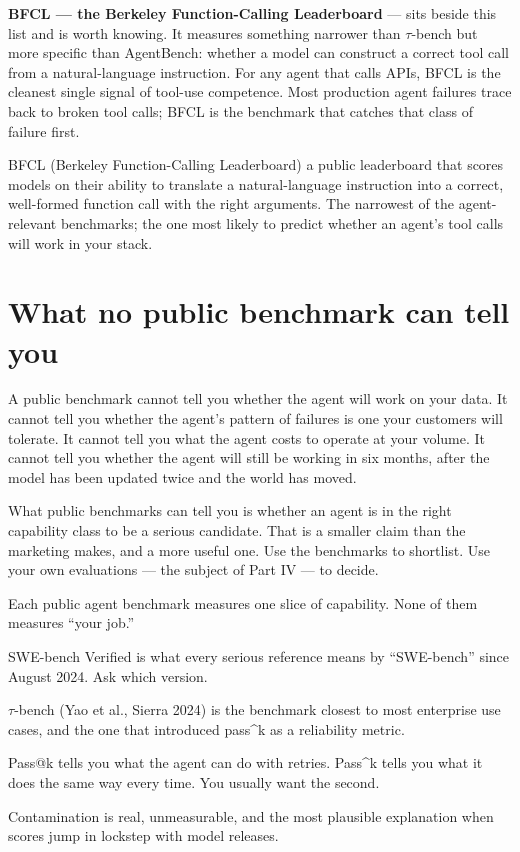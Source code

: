 \textbf{BFCL --- the Berkeley Function-Calling Leaderboard} \citep{bfcl-2024} --- sits beside this list and is worth knowing. It measures something narrower than $\tau$-bench but more specific than AgentBench: whether a model can construct a correct tool call from a natural-language instruction. For any agent that calls APIs, BFCL is the cleanest single signal of tool-use competence. Most production agent failures trace back to broken tool calls; BFCL is the benchmark that catches that class of failure first.

\begin{TNdefinition}{BFCL (Berkeley Function-Calling Leaderboard)} a public leaderboard \citep{bfcl-2024} that scores models on their ability to translate a natural-language instruction into a correct, well-formed function call with the right arguments. The narrowest of the agent-relevant benchmarks; the one most likely to predict whether an agent's tool calls will work in your stack. \end{TNdefinition}

\section{What no public benchmark can tell you}

A public benchmark cannot tell you whether the agent will work on your data. It cannot tell you whether the agent's pattern of failures is one your customers will tolerate. It cannot tell you what the agent costs to operate at your volume. It cannot tell you whether the agent will still be working in six months, after the model has been updated twice and the world has moved.

What public benchmarks can tell you is whether an agent is in the right capability class to be a serious candidate. That is a smaller claim than the marketing makes, and a more useful one. Use the benchmarks to shortlist. Use your own evaluations --- the subject of Part IV --- to decide.

\TNrule

\stoptwocol

\begin{TNkeytakeaways}
\item Each public agent benchmark measures one slice of capability. None of them measures ``your job.''
\item SWE-bench Verified is what every serious reference means by ``SWE-bench'' since August 2024. Ask which version.
\item $\tau$-bench (Yao et al., Sierra 2024) is the benchmark closest to most enterprise use cases, and the one that introduced pass\textasciicircum k as a reliability metric.
\item Pass@k tells you what the agent can do with retries. Pass\textasciicircum k tells you what it does the same way every time. You usually want the second.
\item Contamination is real, unmeasurable, and the most plausible explanation when scores jump in lockstep with model releases.
\end{TNkeytakeaways}

